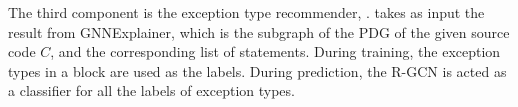 The third component is the exception type recommender, {\xtype}.
{\xtype} takes as input the result from GNNExplainer, which is the
subgraph of the PDG of the given source code $C$, and the
corresponding list of statements. During training, the exception types
in a  block are used as the labels. During prediction,
the R-GCN is acted as a classifier for all the labels of exception
types.
